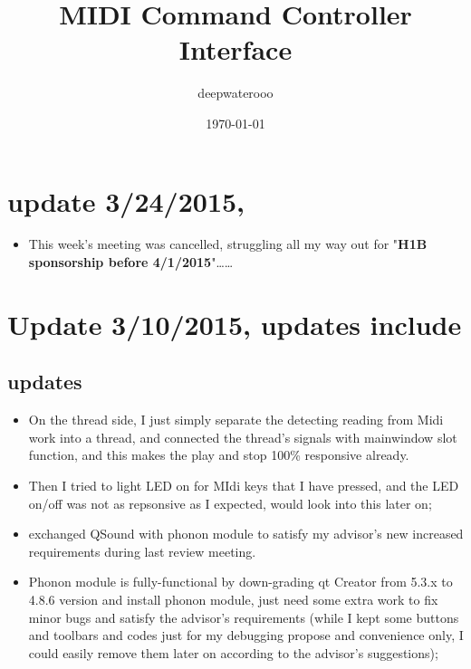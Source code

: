 \documentclass[9pt,b5paper]{article}
\author{deepwaterooo}
\date{\today}
\title{MIDI Command Controller Interface}
\begin{document}
\maketitle
\tableofcontents

\section{update 3/24/2015,}
\label{sec-1}
\begin{itemize}
\item This week's meeting was cancelled, struggling all my way out for "\textbf{H1B sponsorship before 4/1/2015}"\ldots{}\ldots{}
\end{itemize}
\section{Update 3/10/2015, updates include}
\label{sec-2}
\subsection{updates}
\label{sec-2-1}
\begin{itemize}
\item On the thread side, I just simply separate the detecting reading from Midi work into a thread, and connected the thread's signals with mainwindow slot function, and this makes the play and stop 100\% responsive already.
\item Then I tried to light LED on for MIdi keys that I have pressed, and the LED on/off was not as repsonsive as I expected, would look into this later on;
\item exchanged QSound with phonon module to satisfy my advisor's new increased requirements during last review meeting.
\item Phonon module is fully-functional by down-grading qt Creator from 5.3.x to 4.8.6 version and install phonon module, just need some extra work to fix minor bugs and satisfy the advisor's requirements (while I kept some buttons and toolbars and codes just for my debugging propose and convenience only, I could easily remove them later on according to the advisor's suggestions);
\end{itemize}
\end{document}

